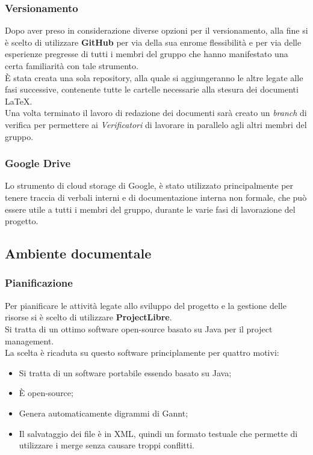     \subsubsection{Versionamento}
      Dopo aver preso in considerazione diverse opzioni per il versionamento, alla fine si è scelto di utilizzare \textbf{GitHub} per via della
      sua enrome flessibilità e per via delle esperienze pregresse di tutti i membri del gruppo che hanno manifestato una certa familiarità con
      tale strumento.\\
      È stata creata una sola repository, alla quale si aggiungeranno le altre legate alle fasi successive, contenente tutte le cartelle necessarie
      alla stesura dei documenti \LaTeX.\\
      Una volta terminato il lavoro di redazione dei documenti sarà creato un \emph{branch} di verifica per permettere ai \emph{Verificatori} di
      lavorare in parallelo agli altri membri del gruppo.
    \subsubsection{Google Drive}
      Lo strumento di cloud storage di Google, è stato utilizzato principalmente per tenere traccia di verbali interni e di documentazione interna
      non formale, che può essere utile a tutti i membri del gruppo, durante le varie fasi di lavorazione del progetto.
  \subsection{Ambiente documentale}
    \subsubsection{Pianificazione}
      Per pianificare le attività legate allo sviluppo del progetto e la gestione delle risorse si è scelto di utilizzare \textbf{ProjectLibre}.\\
      Si tratta di un ottimo software open-source basato su Java per il project management.\\
      La scelta è ricaduta su questo software principlamente per quattro motivi:
      \begin{itemize}
        \item Si tratta di un software portabile essendo basato su Java;
        \item È open-source;
        \item Genera automaticamente digrammi di Gannt;
        \item Il salvataggio dei file è in XML, quindi un formato testuale che permette di utilizzare i merge senza causare troppi conflitti.
      \end{itemize}
